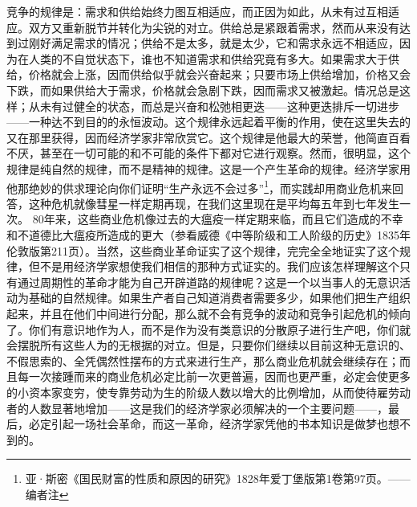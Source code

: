 \documentclass[a4paper,twoside,12pt,AutoFakeBold]{ctexart}
\begin{document}
竞争的规律是：需求和供给始终力图互相适应，而正因为如此，从未有过互相适应。双方又重新脱节并转化为尖锐的对立。供给总是紧跟着需求，然而从来没有达到过刚好满足需求的情况；供给不是太多，就是太少，它和需求永远不相适应，因为在人类的不自觉状态下，谁也不知道需求和供给究竟有多大。如果需求大于供给，价格就会上涨，因而供给似乎就会兴奋起来；只要市场上供给增加，价格又会下跌，而如果供给大于需求，价格就会急剧下跌，因而需求又被激起。情况总是这样；从未有过健全的状态，而总是兴奋和松弛相更迭——这种更迭排斥一切进步——一种达不到目的的永恒波动。这个规律永远起着平衡的作用，使在这里失去的又在那里获得，因而经济学家非常欣赏它。这个规律是他最大的荣誉，他简直百看不厌，甚至在一切可能的和不可能的条件下都对它进行观察。然而，很明显，这个规律是纯自然的规律，而不是精神的规律。这是一个产生革命的规律。经济学家用他那绝妙的供求理论向你们证明“生产永远不会过多”\footnote{亚·斯密《国民财富的性质和原因的研究》1828年爱丁堡版第1卷第97页。——编者注}，而实践却用商业危机来回答，这种危机就像彗星一样定期再现，在我们这里现在是平均每五年到七年发生一次。 80年来，这些商业危机像过去的大瘟疫一样定期来临，而且它们造成的不幸和不道德比大瘟疫所造成的更大（参看威德《中等阶级和工人阶级的历史》1835年伦敦版第211页）。当然，这些商业革命证实了这个规律，完完全全地证实了这个规律，但不是用经济学家想使我们相信的那种方式证实的。我们应该怎样理解这个只有通过周期性的革命才能为自己开辟道路的规律呢？这是一个以当事人的无意识活动为基础的自然规律。如果生产者自己知道消费者需要多少，如果他们把生产组织起来，并且在他们中间进行分配，那么就不会有竞争的波动和竞争引起危机的倾向了。你们有意识地作为人，而不是作为没有类意识的分散原子进行生产吧，你们就会摆脱所有这些人为的无根据的对立。但是，只要你们继续以目前这种无意识的、不假思索的、全凭偶然性摆布的方式来进行生产，那么商业危机就会继续存在；而且每一次接踵而来的商业危机必定比前一次更普遍，因而也更严重，必定会使更多的小资本家变穷，使专靠劳动为生的阶级人数以增大的比例增加，从而使待雇劳动者的人数显著地增加——这是我们的经济学家必须解决的一个主要问题——，最后，必定引起一场社会革命，而这一革命，经济学家凭他的书本知识是做梦也想不到的。
\end{document}
